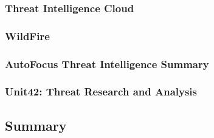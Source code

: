 \subsubsection{Threat Intelligence Cloud}


\subsubsection{WildFire}


\subsubsection{AutoFocus Threat Intelligence Summary}


\subsubsection{Unit42: Threat Research and Analysis}



\subsection{Summary}
